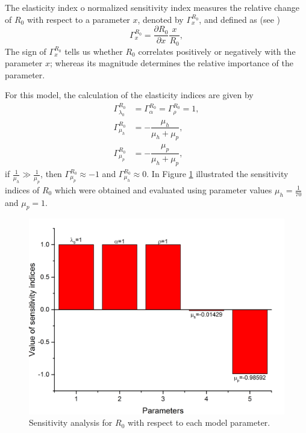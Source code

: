 \documentclass[eng]{MMSB-class-eng}
\begin{document}
{{	The elasticity index o normalized sensitivity index measures the relative change of $R_0$ with respect to a parameter $x$, denoted by $\Gamma^{R_0}_{x}$, and defined as (see \citet{van2017reproduction})
	\begin{equation}
	\Gamma^{R_0}_{x}=\dfrac{\partial R_0}{\partial x} \dfrac{x}{R_0},
	\end{equation}
	The sign of $\Gamma^{R_0}_{x}$ tells us whether $R_0$ correlates positively or negatively  with the  parameter $x$; whereas its magnitude determines the relative importance of the parameter.
	
	For this model, the calculation of the elasticity indices are given by	
	\begin{equation}
	\begin{split}
	\Gamma^{R_0}_{\lambda_0}&=\Gamma^{R_0}_{\alpha}=\Gamma^{R_0}_{\rho}=1,\\ 
	\Gamma^{R_0}_{\mu_h}&=-\dfrac{\mu_h}{\mu_{h}+\mu_p},\\
	\Gamma^{R_0}_{\mu_p}&=-\dfrac{\mu_p}{\mu_{h}+\mu_p},
	\end{split}
	\end{equation}
	if $\frac{1}{\mu_h} \gg \frac{1}{\mu_p}$, then $\Gamma^{R_0}_{\mu_p}\approx -1$
	and 
	$\Gamma^{R_0}_{\mu_h}\approx 0$.
	In Figure \ref{fig:sensitivity} illustrated the sensitivity indices of $R_0$ which were obtained and evaluated using parameter values 
	$\mu_h=\frac{1}{70}$ and $\mu_p=1$.
	\begin{figure}[h!]
		\centering
		\includegraphics[width=0.9\linewidth]{sensitivity}
		\caption{Sensitivity analysis for $R_0$ with respect to each model parameter.}
		\label{fig:sensitivity}
	\end{figure}
	
}}
\end{document}
